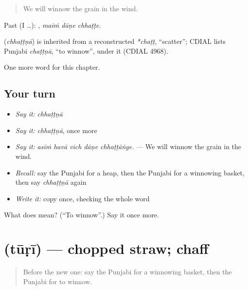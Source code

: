 \begin{quote}
We will winnow the grain in the wind.
\end{quote}

Past (I …):   , \emph{maiṁ dāṇe chhaṭṭe}.

\begin{cousinweb}
\textbf{} (\emph{chhaṭṭṇā}) is inherited from a reconstructed \emph{*chaṭṭ}, \textquotedblleft{}scatter\textquotedblright{}; CDIAL lists Punjabi \emph{chaṭṭṇā}, \textquotedblleft{}to winnow\textquotedblright{}, under it (CDIAL 4968).
\end{cousinweb}

\begin{grammarlens}[title={What you've built}]
One more word for this chapter.
\end{grammarlens}

\subsection*{Your turn}
\begin{itemize}
\raggedright
  \item \emph{Say it:} \emph{chhaṭṭṇā}
  \item \emph{Say it:} \emph{chhaṭṭṇā}, once more
  \item \emph{Say it:} \emph{asīṁ havā vich dāṇe chhaṭṭāṅge.} — We will winnow the grain in the wind.
  \item \emph{Recall:} say the Punjabi for a heap, then the Punjabi for a winnowing basket, then say \emph{chhaṭṭṇā} again
  \item \emph{Write it:} copy \textbf{} once, checking the whole word
\end{itemize}

\begin{tcolorbox}[breakable,colback=teal!4,colframe=teal!35!black,title={Before you move on}]
What does  mean? (\textquotedblleft{}To winnow\textquotedblright{}.) Say it once more.
\end{tcolorbox}
\section[\texorpdfstring{\pa{ਤੂੜੀ} (tūṛī)}{ਤੂੜੀ (tūṛī)}]{ (tūṛī) — chopped straw; chaff}

\label{lesson:PA-C306-turi}



\begin{quote}
Before the new one: say the Punjabi for a winnowing basket, then the Punjabi for to winnow.
\end{quote}

